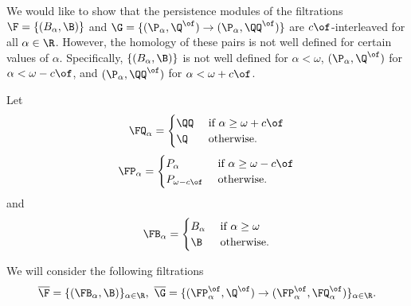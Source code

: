 
We would like to show that the persistence modules of the filtrations $\F = \{(B_\alpha, \B)\}$ and $\G = \{(\P_\alpha, \Q^\of)\to (\P_\alpha, \QQ^\of)\}$ are $c\of$-interleaved for all $\alpha\in\R$.
However, the homology of these pairs is not well defined for certain values of $\alpha$.
Specifically, $\{(B_\alpha, \B)\}$ is not well defined for $\alpha < \omega$, $(\P_\alpha, \Q^\of)$ for $\alpha < \omega-c\of$, and $(\P_\alpha, \QQ^\of)$ for $\alpha < \omega+c\of$.

Let
\[\FQ_\alpha = \begin{cases} \QQ&\text{ if } \alpha\geq \omega+c\of\\ \Q&\text{ otherwise.}\end{cases}\]
\[\FP_\alpha = \begin{cases} P_\alpha&\text{ if } \alpha\geq \omega-c\of\\ P_{\omega-c\of}&\text{ otherwise.}\end{cases}\]
and
\[\FB_\alpha = \begin{cases} B_\alpha&\text{ if } \alpha\geq\omega\\ \B&\text{ otherwise.}\end{cases}\]

We will consider the following filtrations
\[ \overline{\F} = \{(\FB_\alpha, \B)\}_{\alpha\in\R},\ \overline{\G} = \{(\FP^\of_\alpha, \Q^\of)\to (\FP^\of_\alpha, \FQ^\of_\alpha)\}_{\alpha\in\R}.\]

